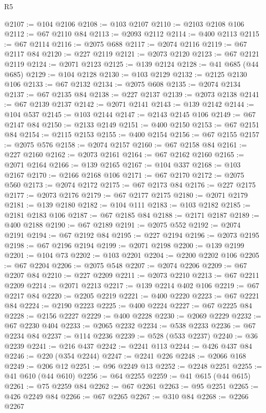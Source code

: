 \begin{lexlean}{R5}
\begin{coremodule}
@2107 := @104 @2106
@2108 := @103 @2107
@2110 := @2103 @2108 @106
@2112 := @67 @2110 @84
@2113 := @2093 @2112
@2114 := @400 @2113
@2115 := @67 @2114
@2116 := @2075 @688
@2117 := @2074 @2116
@2119 := @67 @2117 @84
@2120 := @227 @2119
@2121 := @2073 @2120
@2123 := @67 @2121 @2119
@2124 := @2071 @2123
@2125 := @139 @2124
@2128 := @41 @685 (@44 @685)
@2129 := @104 @2128
@2130 := @103 @2129
@2132 := @2125 @2130 @106
@2133 := @67 @2132
@2134 := @2075 @608
@2135 := @2074 @2134
@2137 := @67 @2135 @84
@2138 := @227 @2137
@2139 := @2073 @2138
@2141 := @67 @2139 @2137
@2142 := @2071 @2141
@2143 := @139 @2142
@2144 := @104 @537
@2145 := @103 @2144
@2147 := @2143 @2145 @106
@2149 := @67 @2147 @84
@2150 := @2133 @2149
@2151 := @400 @2150
@2153 := @67 @2151 @84
@2154 := @2115 @2153
@2155 := @400 @2154
@2156 := @67 @2155
@2157 := @2075 @576
@2158 := @2074 @2157
@2160 := @67 @2158 @84
@2161 := @227 @2160
@2162 := @2073 @2161
@2164 := @67 @2162 @2160
@2165 := @2071 @2164
@2166 := @139 @2165
@2167 := @104 @337
@2168 := @103 @2167
@2170 := @2166 @2168 @106
@2171 := @67 @2170
@2172 := @2075 @560
@2173 := @2074 @2172
@2175 := @67 @2173 @84
@2176 := @227 @2175
@2177 := @2073 @2176
@2179 := @67 @2177 @2175
@2180 := @2071 @2179
@2181 := @139 @2180
@2182 := @104 @111
@2183 := @103 @2182
@2185 := @2181 @2183 @106
@2187 := @67 @2185 @84
@2188 := @2171 @2187
@2189 := @400 @2188
@2190 := @67 @2189
@2191 := @2075 @552
@2192 := @2074 @2191
@2194 := @67 @2192 @84
@2195 := @227 @2194
@2196 := @2073 @2195
@2198 := @67 @2196 @2194
@2199 := @2071 @2198
@2200 := @139 @2199
@2201 := @104 @73
@2202 := @103 @2201
@2204 := @2200 @2202 @106
@2205 := @67 @2204
@2206 := @2075 @548
@2207 := @2074 @2206
@2209 := @67 @2207 @84
@2210 := @227 @2209
@2211 := @2073 @2210
@2213 := @67 @2211 @2209
@2214 := @2071 @2213
@2217 := @139 @2214 @402 @106
@2219 := @67 @2217 @84
@2220 := @2205 @2219
@2221 := @400 @2220
@2223 := @67 @2221 @84
@2224 := @2190 @2223
@2225 := @400 @2224
@2227 := @67 @2225 @84
@2228 := @2156 @2227
@2229 := @400 @2228
@2230 := @2069 @2229
@2232 := @67 @2230 @404
@2233 := @2065 @2232
@2234 := @538 @2233
@2236 := @67 @2234 @84
@2237 := @114 @2236
@2239 := @528 (@533 @2237)
@2240 := @36 @2239
@2241 := @216 @437
@2242 := @2241 @113
@2244 := @426 @437 @84
@2246 := @220 (@354 @2244)
@2247 := @2241 @226
@2248 := @2066 @168
@2249 := @206 @12
@2251 := @96 @2249 @13
@2252 := @2248 @2251
@2255 := @41 @610 (@44 @610)
@2256 := @64 @2255
@2259 := @41 @615 (@44 @615)
@2261 := @75 @2259 @84
@2262 := @67 @2261
@2263 := @95 @2251
@2265 := @426 @2249 @84
@2266 := @67 @2265
@2267 := @310 @84
@2268 := @2266 @2267

\end{coremodule}
\end{lexlean}
